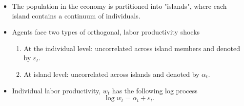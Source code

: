 \documentclass[notes=show]{beamer}
\begin{document}
\begin{frame}%


\begin{itemize}
\item The population in the economy is partitioned into "islands", where
each island contains a continuum of individuals.

\item Agents face two types of orthogonal, labor productivity shocks

\begin{enumerate}
\item At the individual level: uncorrelated across island members and
denoted by $\varepsilon _{t}$.

\item At island level: uncorrelated across islands and denoted by $\alpha
_{t}$.
\end{enumerate}

\item Individual labor productivity, $w_{t}$ has the following log process%
\begin{equation}
\log w_{t}=\alpha _{t}+\varepsilon _{t}.
\end{equation}
\end{itemize}

\transboxout%
\end{frame}%

\bigskip
\end{document}
